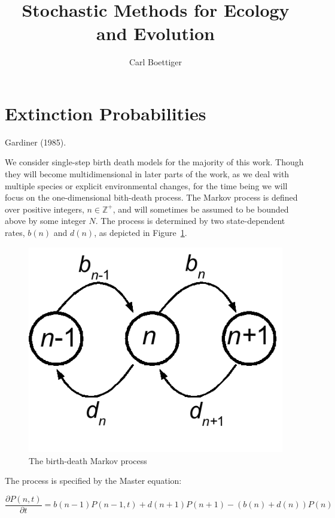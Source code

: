 \documentclass[letterpaper,10pt]{article}
\title{Stochastic Methods for Ecology and Evolution}
\author{Carl Boettiger}
\begin{document}
\maketitle



\section{Extinction Probabilities}

Gardiner (1985).  

We consider single-step birth death models for the majority of this work.  Though they will become multidimensional in later parts of the work, as we deal with multiple species or explicit environmental changes, for the time being we will focus on the one-dimensional bith-death process.  The Markov process is defined over positive integers, $n \in \mathbb{Z}^+$, and will sometimes be assumed to be bounded above by some integer $N$.  The process is determined by two state-dependent rates, $b(n)$ and $d(n)$, as depicted in Figure~\ref{fig:markov}.  

\begin{figure}[h]
\begin{center}
\includegraphics[width=.4\textwidth]{images/markov}
\end{center}
\caption{The birth-death Markov process}
\label{fig:markov}
\end{figure}

The process is specified by the Master equation:

\begin{equation}
\frac{\partial P(n,t)}{\partial t} = b(n-1)P(n-1,t)+d(n+1)P(n+1) - \left( b(n) + d(n)  \right) P(n)
\label{mastereq}
\end{equation}
\end{document}
